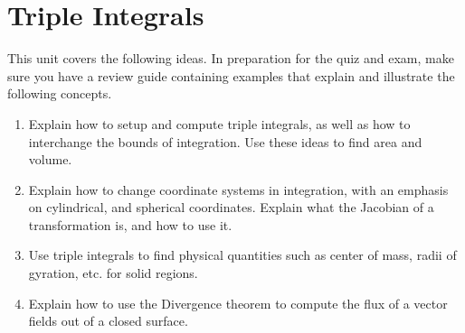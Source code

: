 \documentclass[10pt,]{book}
\theoremstyle{plain}
\theoremstyle{definition}
\theoremstyle{definition}
\theoremstyle{definition}
\theoremstyle{definition}
\theoremstyle{definition}
\numberwithin{equation}{section}
\begin{document}
\chapter[{Triple Integrals}]{Triple Integrals}\label{chapter-13}
This unit covers the following ideas. In preparation for the quiz and exam, make sure you have a review guide containing examples that explain and illustrate the following concepts. \leavevmode%
\begin{enumerate}
\item\hypertarget{li-213}{}Explain how to setup and compute triple integrals, as well as how to interchange the bounds of integration. Use these ideas to find area and volume.%
\item\hypertarget{li-214}{}Explain how to change coordinate systems in integration, with an emphasis on cylindrical, and spherical coordinates. Explain what the Jacobian of a transformation is, and how to use it.%
\item\hypertarget{li-215}{}Use triple integrals to find physical quantities such as center of mass, radii of gyration, etc. for solid regions.%
\item\hypertarget{li-216}{}Explain how to use the Divergence theorem to compute the flux of a vector fields out of a closed surface.%
\end{enumerate}
%
\typeout{************************************************}
\typeout{************************************************}
\end{document}
